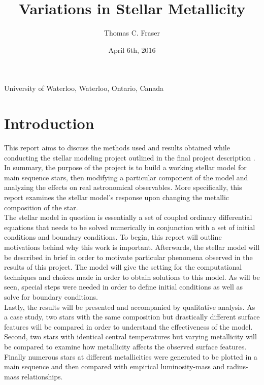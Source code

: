\documentclass[11pt]{article}
\begin{document}
    \title{Variations in Stellar Metallicity}
    \author[20460785]{Thomas C. Fraser}{University of Waterloo, Waterloo, Ontario, Canada}
    \date{April 6th, 2016}
    \section*{Introduction}
    This report aims to discuss the methods used and results obtained while conducting the stellar modeling project outlined in the final project description \cite{projectdesciption}. In summary, the purpose of the project is to build a working stellar model for main sequence stars, then modifying a particular component of the model and analyzing the effects on real astronomical observables. More specifically, this report examines the stellar model's response upon changing the metallic composition of the star. \\

    The stellar model in question is essentially a set of coupled ordinary differential equations that needs to be solved numerically in conjunction with a set of initial conditions and boundary conditions. To begin, this report will outline motivations behind why this work is important. Afterwards, the stellar model will be described in brief in order to motivate particular phenomena observed in the results of this project. The model will give the setting for the computational techniques and choices made in order to obtain solutions to this model. As will be seen, special steps were needed in order to define initial conditions as well as solve for boundary conditions. \\

    Lastly, the results will be presented and accompanied by qualitative analysis. As a case study, two stars with the same composition but drastically different surface features will be compared in order to understand the effectiveness of the model. Second, two stars with identical central temperatures but varying metallicity will be compared to examine how metallicity affects the observed surface features. Finally numerous stars at different metallicities were generated to be plotted in a main sequence and then compared with empirical luminosity-mass and radius-mass relationships. \\
\end{document}

